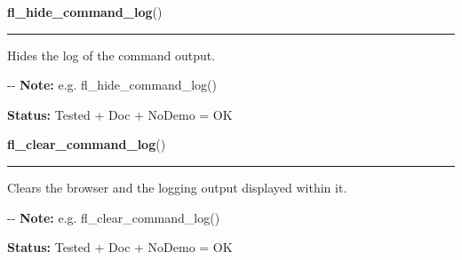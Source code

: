     \label{xformslib:flgoodies:fl_hide_command_log}

    \vspace{0.5ex}

\hspace{.8\funcindent}\begin{boxedminipage}{\funcwidth}

    \raggedright \textbf{fl\_hide\_command\_log}()

    \vspace{-1.5ex}

    \rule{\textwidth}{0.5\fboxrule}
\setlength{\parskip}{2ex}

Hides the log of the command output.

-{}-
\setlength{\parskip}{1ex}
\textbf{Note:} 
e.g. fl\_hide\_command\_log()


\textbf{Status:} 
Tested + Doc + NoDemo = OK


    \end{boxedminipage}

    \label{xformslib:flgoodies:fl_clear_command_log}

    \vspace{0.5ex}

\hspace{.8\funcindent}\begin{boxedminipage}{\funcwidth}

    \raggedright \textbf{fl\_clear\_command\_log}()

    \vspace{-1.5ex}

    \rule{\textwidth}{0.5\fboxrule}
\setlength{\parskip}{2ex}

Clears the browser and the logging output displayed within it.

-{}-
\setlength{\parskip}{1ex}
\textbf{Note:} 
e.g. fl\_clear\_command\_log()


\textbf{Status:} 
Tested + Doc + NoDemo = OK


    \end{boxedminipage}

    \label{xformslib:flgoodies:fl_addto_command_log}

